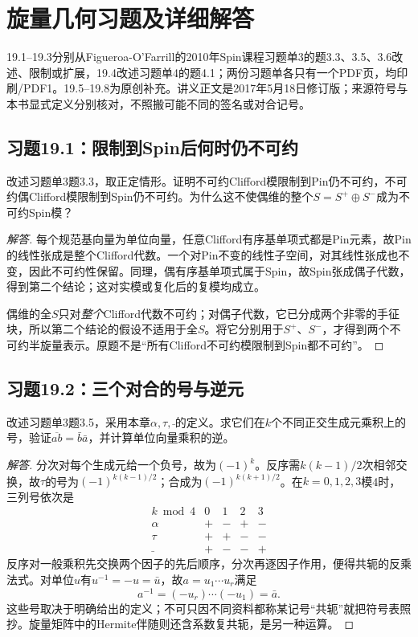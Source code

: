 \section{旋量几何习题及详细解答}
19.1--19.3分别从Figueroa-O'Farrill的2010年Spin课程习题单3的题3.3、3.5、3.6改述、限制或扩展，19.4改述习题单4的题4.1；两份习题单各只有一个PDF页，均印刷/PDF1。19.5--19.8为原创补充。讲义正文是2017年5月18日修订版；来源符号与本书显式定义分别核对，不照搬可能不同的签名或对合记号。

\subsection*{习题19.1：限制到Spin后何时仍不可约}
改述习题单3题3.3，取正定情形。证明不可约Clifford模限制到Pin仍不可约，不可约偶Clifford模限制到Spin仍不可约。为什么这不使偶维的整个$S=S^+\oplus S^-$成为不可约Spin模？
\begin{proof}[解答]
每个规范基向量为单位向量，任意Clifford有序基单项式都是Pin元素，故Pin的线性张成是整个Clifford代数。一个对Pin不变的线性子空间，对其线性张成也不变，因此不可约性保留。同理，偶有序基单项式属于Spin，故Spin张成偶子代数，得到第二个结论；这对实模或复化后的复模均成立。

偶维的全$S$只对\emph{整个}Clifford代数不可约；对偶子代数，它已分成两个非零的手征块，所以第二个结论的假设不适用于全$S$。将它分别用于$S^+$、$S^-$，才得到两个不可约半旋量表示。原题不是“所有Clifford不可约模限制到Spin都不可约”。
\end{proof}

\subsection*{习题19.2：三个对合的号与逆元}
改述习题单3题3.5，采用本章$\alpha,\tau,\bar{\ }$的定义。求它们在$k$个不同正交生成元乘积上的号，验证$\overline{ab}=\bar b\bar a$，并计算单位向量乘积的逆。
\begin{proof}[解答]
分次对每个生成元给一个负号，故为$(-1)^k$。反序需$k(k-1)/2$次相邻交换，故$\tau$的号为$(-1)^{k(k-1)/2}$；合成为$(-1)^{k(k+1)/2}$。在$k=0,1,2,3$模4时，三列号依次是
\[
 \begin{array}{c|rrrr}
 k\bmod4&0&1&2&3\\\hline
 \alpha&+&-&+&-\\
 \tau&+&+&-&-\\
 \bar{\ }&+&-&-&+
 \end{array}
\]
反序对一般乘积先交换两个因子的先后顺序，分次再逐因子作用，便得共轭的反乘法式。对单位$u$有$u^{-1}=-u=\bar u$，故$a=u_1\cdots u_r$满足
\[
 a^{-1}=(-u_r)\cdots(-u_1)=\bar a.
\]
这些号取决于明确给出的定义；不可只因不同资料都称某记号“共轭”就把符号表照抄。旋量矩阵中的Hermite伴随则还含系数复共轭，是另一种运算。
\end{proof}

